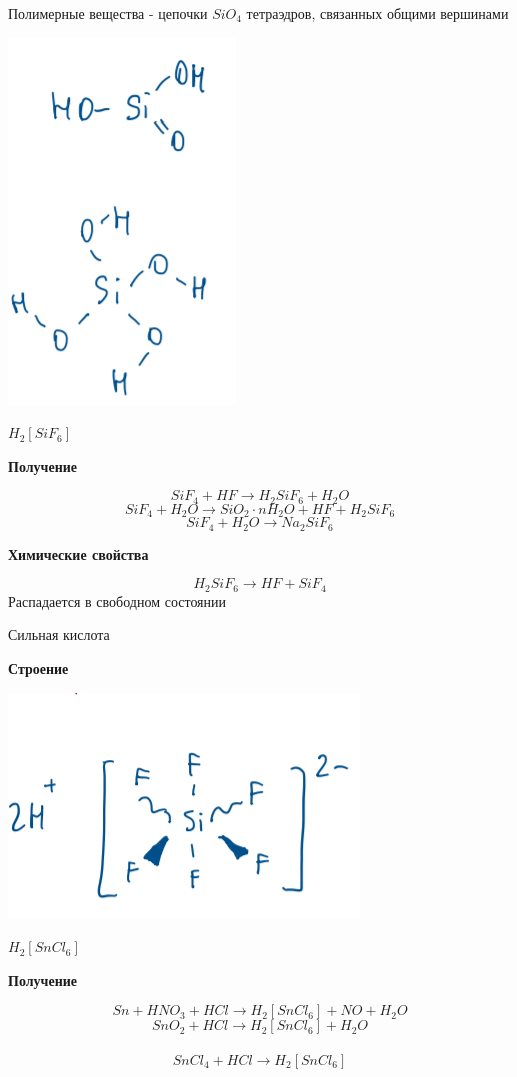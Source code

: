 \documentclass[14pt,a4paper]{scrartcl}
\begin{document}
Полимерные вещества - цепочки $SiO_4$ тетраэдров, связанных общими вершинами

\includegraphics{10v7.png}

$H_2[SiF_6]$

\textbf{Получение}

$$SiF_4 + HF \rightarrow H_2SiF_6 + H_2O$$
$$SiF_4 + H_2O \rightarrow SiO_2\cdot nH_2O + HF + H_2SiF_6$$
$$SiF_4 + H_2O \rightarrow Na_2SiF_6$$

\textbf{Химические свойства}

$$H_2SiF_6 \rightarrow HF + SiF_4$$
Распадается в свободном состоянии

Сильная кислота


\textbf{Строение}

\includegraphics{10v8.png}

$H_2[SnCl_6]$

\textbf{Получение}

$$Sn + HNO_3 + HCl \rightarrow H_2[SnCl_6] + NO + H_2O$$
$$SnO_2 + HCl \rightarrow H_2[SnCl_6] + H_2O$$\\
$$SnCl_4 + HCl \rightarrow H_2[SnCl_6]$$
\end{document}
